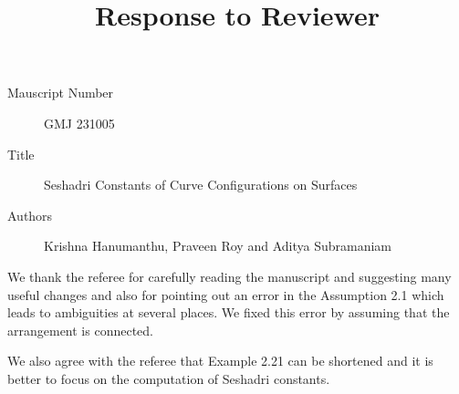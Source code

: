 \documentclass[12pt,twoside,reqno]{amsart}
\numberwithin{equation}{section}
\theoremstyle{definition}
\begin{document}
\title{Response to Reviewer}
\begin{description}
\item [Mauscript Number] GMJ 231005 \\
\item [Title] Seshadri Constants of Curve Configurations on Surfaces
\item [Authors] Krishna Hanumanthu, Praveen Roy and Aditya Subramaniam
\end{description}

We thank the referee for carefully reading the manuscript and suggesting 
many useful changes and also for pointing out an error in the Assumption 2.1 which leads to 
ambiguities at several places. We fixed this error by assuming that the arrangement is connected. 

We also agree with the referee that Example 2.21 can be shortened and it is better to 
focus on the computation of Seshadri constants. 
\end{document}
